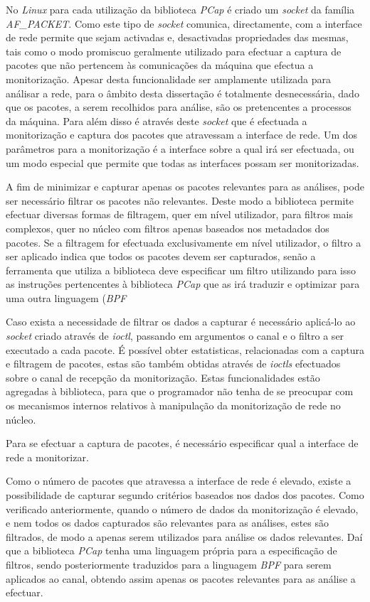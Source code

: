 No \textit{Linux} para cada utilização da biblioteca \textit{PCap} é criado um \textit{socket} da família \textit{AF\_PACKET}.
Como este tipo de \textit{socket} comunica, directamente, com a interface de rede permite que sejam activadas e, desactivadas propriedades das mesmas, tais como o modo promiscuo geralmente utilizado para efectuar a captura de pacotes que não pertencem às comunicações da máquina que efectua a monitorização.
Apesar desta funcionalidade ser amplamente utilizada para análisar a rede, para o âmbito desta dissertação é totalmente desnecessária, dado que os pacotes, a serem recolhidos para análise, são os pretencentes a processos da máquina.
Para além disso é através deste \textit{socket} que é efectuada a monitorização e captura dos pacotes que atravessam a interface de rede.
Um dos parâmetros para a monitorização é a interface sobre a qual irá ser efectuada, ou um modo especial que permite que todas as interfaces possam ser monitorizadas.

A fim de minimizar e capturar apenas os pacotes relevantes para as análises, pode ser necessário filtrar os pacotes não relevantes.
Deste modo a biblioteca permite efectuar diversas formas de filtragem, quer em nível utilizador, para filtros mais complexos, quer no núcleo com filtros apenas baseados nos metadados dos pacotes.
Se a filtragem for efectuada exclusivamente em nível utilizador, o filtro a ser aplicado indica que todos os pacotes devem ser capturados, senão a ferramenta que utiliza a biblioteca deve especificar um filtro utilizando para isso as instruções pertencentes à biblioteca \textit{PCap} que as irá traduzir e optimizar para uma outra linguagem (\textit{BPF}
 


Caso exista a necessidade de filtrar os dados a capturar é necessário aplicá-lo ao \textit{socket} criado através de \textit{ioctl}, passando em argumentos o canal e o filtro a ser executado a cada pacote.
É possível obter estatisticas, relacionadas com a captura e filtragem de pacotes, estas são também obtidas através de \textit{ioctls} efectuados sobre o canal de recepção da monitorização.
Estas funcionalidades estão agregadas à biblioteca, para que o programador não tenha de se preocupar com os mecanismos internos relativos à manipulação da monitorização de rede no núcleo.

Para se efectuar a captura de pacotes, é necessário especificar qual a interface de rede a monitorizar.

Como o número de pacotes que atravessa a interface de rede é elevado, existe a possibilidade de capturar segundo critérios baseados nos dados dos pacotes.
Como verificado anteriormente, quando o número de dados da monitorização é elevado, e nem todos os dados capturados são relevantes para as análises, estes são filtrados, de modo a apenas serem utilizados para análise os dados relevantes.
Daí que a biblioteca \textit{PCap} tenha uma linguagem própria para a especificação de filtros, sendo posteriormente traduzidos para a linguagem \textit{BPF} para serem aplicados ao canal, obtendo assim apenas os pacotes relevantes para as análise a efectuar.

